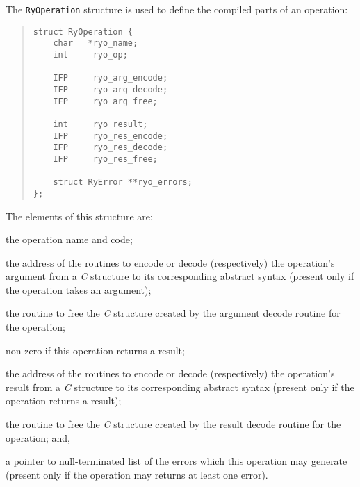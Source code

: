 The \verb"RyOperation" structure is used to define the compiled parts of an
operation:
\begin{quote}\small{}\begin{verbatim}
struct RyOperation {
    char   *ryo_name;
    int     ryo_op;

    IFP     ryo_arg_encode;
    IFP     ryo_arg_decode;
    IFP     ryo_arg_free;

    int     ryo_result;
    IFP     ryo_res_encode;
    IFP     ryo_res_decode;
    IFP     ryo_res_free;

    struct RyError **ryo_errors;
};
\end{verbatim}\end{quote}
The elements of this structure are:
\begin{describe}
\item[\verb"ryo\_name"/\verb"ryo\_op":] the operation name and code;

\item[\verb"ryo\_arg\_encode"/\verb"ryo\_arg\_decode":] the address of the
routines to encode or decode (respectively) the operation's argument from a
{\em C\/} structure to its corresponding abstract syntax
(present only if the operation takes an argument);

\item[\verb"ryo\_arg\_free":] the routine to free the {\em C\/} structure
created by the argument decode routine for the operation;

\item[\verb"ryo\_result":] non-zero if this operation returns a result;

\item[\verb"ryo\_res\_encode"/\verb"ryo\_res\_decode":] the address of the
routines to encode or decode (respectively) the operation's result from a
{\em C\/} structure to its corresponding abstract syntax
(present only if the operation returns a result);

\item[\verb"ryo\_res\_free":] the routine to free the {\em C\/} structure
created by the result decode routine for the operation;
and,

\item[\verb"ryo\_errors":] a pointer to null-terminated list of the errors
which this operation may generate (present only if the operation may returns
at least one error).
\end{describe}

